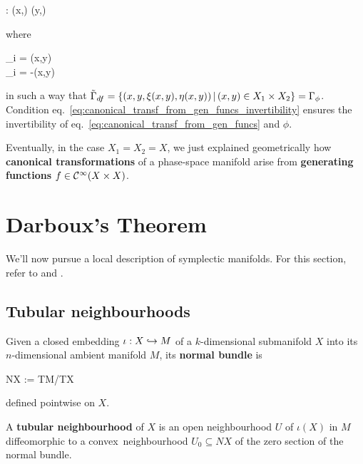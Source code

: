 \documentclass[main.tex]{subfiles}
\begin{document}
\begin{construction}
\begin{enumerate}
\begin{eqalign}
			\phi : (x,\xi) \mapsto (y,\eta)
		\end{eqalign}
		where
		\begin{eqalign}
		\label{eq:canonical_transf_from_gen_funcs}
			\begin{cases}
				\xi_i = (x,y)\\
				\eta_i = -(x,y)
			\end{cases}
		\end{eqalign}
		in such a way that $\tilde\Gamma_{df} = \{(x,y,\xi (x,y),\eta (x,y)) \,|\, (x,y) \in X_1 \times X_2\} = \Gamma_\phi$. Condition eq.~\eqref{eq:canonical_transf_from_gen_funcs_invertibility} ensures the invertibility of eq.~\eqref{eq:canonical_transf_from_gen_funcs} and $\phi$. 
	\end{enumerate}
\end{construction}

Eventually, in the case $X_1 = X_2 = X$, we just explained geometrically how \textbf{canonical transformations} of a phase-space manifold arise from \textbf{generating functions} $f \in \mathcal{C}^\infty(X \times X)$.

\section{Darboux's Theorem}
We'll now pursue a local description of symplectic manifolds. For this section, refer to \cite[Section 1.4]{cannas2005symplectic} and \cite[Section 1.5]{cannas2005symplectic}.

\subsection{Tubular neighbourhoods}
\begin{definition}
	Given a closed embedding ${\iota : X \hookrightarrow M}$ of a $k$-dimensional submanifold $X$ into its $n$-dimensional ambient manifold $M$, its \textbf{normal bundle} is
	\begin{eqalign}
		NX := TM/TX
	\end{eqalign}
	defined pointwise on $X$.
\end{definition}

\begin{definition}
	A \textbf{tubular neighbourhood} of $X$ is an open neighbourhood $U$ of $\iota(X)$ in $M$ diffeomorphic to a convex\footnotemark\ neighbourhood $U_0 \subseteq NX$ of the zero section of the normal bundle.
\end{definition}
\end{document}
